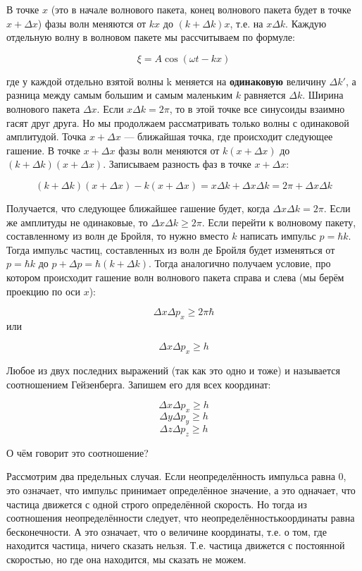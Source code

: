 \documentclass[a4paper,14pt]{article}
\begin{document}
В точке $x$ (это в начале волнового пакета, конец волнового пакета будет в точке $x+\Delta x$) фазы волн меняются от $kx$ до $(k+\Delta k)x$, т.е. на $x\Delta k$. Каждую отдельную волну в волновом пакете мы рассчитываем по формуле:

\[\xi=A\cos(\omega t - kx)\]

где у каждой отдельно взятой волны k меняется на \textbf{одинаковую} величину $\Delta k'$, а разница между самым большим и самым маленьким $k$ равняется $\Delta k$. Ширина волнового пакета $\Delta x$. Если $x\Delta k =2\pi$, то в этой точке все синусоиды взаимно гасят друг друга. Но мы продолжаем рассматривать только волны с одинаковой амплитудой. Точка $x+\Delta x$ --- ближайшая точка, где происходит следующее гашение. В точке $x + \Delta x$ фазы волн меняются от $k(x +\Delta x)$ до $(k + \Delta k)(x + \Delta x)$. Записываем разность фаз в точке $x + \Delta x$:

\[(k + \Delta k)(x + \Delta x) - k(x+\Delta x) = x\Delta k + \Delta x \Delta k =2\pi + \Delta x\Delta k\]

Получается, что следующее ближайшее гашение будет, когда $\Delta x\Delta k = 2\pi$. Если же амплитуды не одинаковые, то $\Delta x\Delta k \geqslant 2\pi$. Если перейти к волновому пакету, составленному из волн де Бройля, то нужно вместо $k$ написать импульс $p=\hbar k$. Тогда импульс частиц, составленных из волн де Бройля будет изменяться от $p=\hbar k$ до $p + \Delta p=\hbar(k+\Delta k)$. Тогда аналогично получаем условие, про котором происходит гашение волн волнового пакета справа и слева (мы берём проекцию по оси $x$):

\[\Delta x\Delta p_x \geqslant 2\pi \hbar\] или

\[ \Delta x \Delta p_x \geqslant h\]

Любое из двух последних выражений (так как это одно и тоже) и называется соотношением Гейзенберга. Запишем его для всех координат:

\[ \Delta x \Delta p_x \geqslant h\]
\[ \Delta y \Delta p_y \geqslant h\]
\[ \Delta z \Delta p_z \geqslant h\]

О чём говорит это соотношение?

Рассмотрим два предельных случая. Если неопределённость импульса равна 0, это означает, что импульс принимает определённое значение, а это одначает, что частица движется с одной строго определённой скорость. Но тогда из соотношения неопределённости следует, что неопределённостькоординаты равна бесконечности. А это означает, что о величине координаты, т.е. о том, где находится частица, ничего сказать нельзя. Т.е. частица движется с постоянной скоростью, но где она находится, мы сказать не можем.
\end{document}
